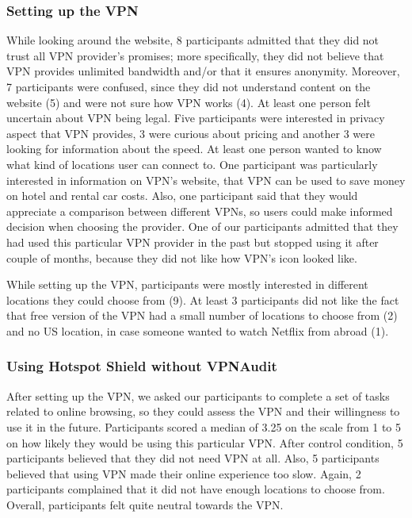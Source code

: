 \subsubsection{Setting up the VPN}

While looking around the website, 8 participants admitted that they did not
trust all VPN provider's promises; more specifically, they did not believe
that VPN provides unlimited bandwidth and/or that it ensures anonymity.
Moreover, 7 participants were confused, since they did not understand content
on the website (5) and were not sure how VPN works (4). At least one person
felt uncertain about VPN being legal. Five participants were interested in
privacy aspect that VPN provides, 3 were curious about pricing and another 3
were looking for information about the speed. At least one person wanted to
know what kind of locations user can connect to. One participant was
particularly interested in information on VPN's website, that VPN can be used
to save money on hotel and rental car costs.  Also, one participant said that
they would appreciate a comparison between different VPNs, so users could make
informed decision when choosing the provider. One of our participants admitted
that they had used this particular VPN provider in the past but stopped using
it after couple of months, because they did not like how VPN's icon looked
like. 

While setting up the VPN, participants were mostly interested in different
locations they could choose from (9). At least 3 participants did not like the
fact that free version of the VPN had a small number of locations to choose
from (2) and no US location, in case someone wanted to watch Netflix from
abroad (1).


\subsubsection{Using Hotspot Shield without VPNAudit}

After setting up the VPN, we asked our participants to complete a set of tasks
related to online browsing, so they could assess the VPN and their willingness
to use it in the future. Participants scored a median of 3.25 on the scale
from 1 to 5 on how likely they would be using this particular VPN. After
control condition, 5 participants believed that they did not need VPN at all.
Also, 5 participants believed that using VPN made their online experience too
slow. Again, 2 participants complained that it did not have enough locations
to choose from. Overall, participants felt quite neutral towards the VPN.


